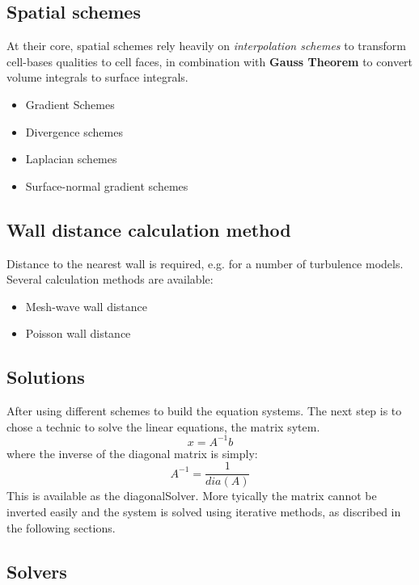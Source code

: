 \documentclass{article}
\begin{document}
\subsection{Spatial schemes}

At their core, spatial schemes rely heavily on \textit{interpolation schemes} to transform cell-bases qualities to cell faces, in combination with \textbf{Gauss Theorem} to convert volume integrals to surface integrals.

\begin{itemize}
\item Gradient Schemes
\item Divergence schemes
\item Laplacian schemes
\item Surface-normal gradient schemes
\end{itemize}

\subsection{Wall distance calculation method}

Distance to the nearest wall is required, e.g. for a number of turbulence models. Several calculation methods are available:
\begin{itemize}
\item Mesh-wave wall distance
\item Poisson wall distance 
\end{itemize}

\subsection{Solutions}

After using different schemes to build the equation systems. The next step is to chose a technic to solve the linear equations, the matrix sytem. 
\begin{equation}
x = A^{-1}b
\end{equation}
where the inverse of the diagonal matrix is simply:
\begin{equation}
A^{-1} = \frac{1}{dia(A)}
\end{equation}
This is available as the diagonalSolver. More tyically the matrix cannot be inverted easily and the system is solved using iterative methods, as discribed in the following sections. 

\subsection{Solvers}
\end{document}
